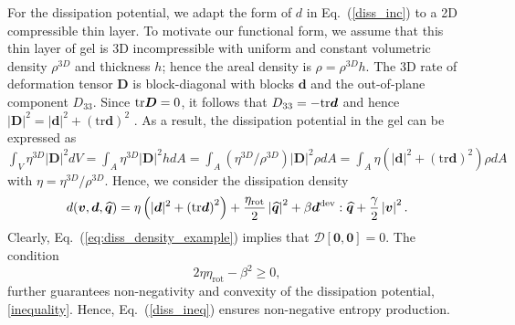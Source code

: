 \documentclass[12pt]{iopart}
\begin{document}
	For the dissipation potential, we adapt the form of $d$ in Eq.~(\ref{diss_inc}) to a 2D compressible thin layer. To motivate our functional form, we assume that this thin layer of gel is 3D incompressible with uniform and constant volumetric density $\rho^{3D}$ and thickness $h$; hence the areal density is $\rho = \rho^{3D} h$. The 3D rate of deformation tensor $\bm{D}$
	is block-diagonal with blocks $\bm{d}$ and the out-of-plane component $D_{33}$. Since ${\rm tr}\bm{D}=0$, it follows that $D_{33} = -{\rm tr}\bm{d}$ and hence $|\bm{D}|^2 = |\bm{d}|^2 + \left(\text{tr}\bm{d}\right)^2$  \cite{salbreux2009}. As a result, the dissipation potential in the gel can be expressed as $\int_V \eta^{3D} |\bm{D}|^2 dV = \int_A \eta^{3D} |\bm{D}|^2 h dA= \int_A (\eta^{3D}/\rho^{3D}) |\bm{D}|^2 \rho dA =  \int_A \eta(|\bm{d}|^2 + \left(\text{tr}\bm{d}\right)^2)\rho dA$ with $\eta =\eta^{3D}/\rho^{3D}$. Hence, we consider the dissipation density
	\begin{equation}
		\label{eq:diss_density_example}
		d(\bm{v},\bm{d},\widehat{\bm{q}}) =  \eta \left(|\bm{d}|^2 + \left(\text{tr}\bm{d}\right)^2\right) +\frac{\eta_{\text{rot}}}{2}  \left|\widehat{\bm{q}}\right|^2+ \beta  \bm{d}^{\rm dev}:\widehat{\bm{q}}  + \frac{\gamma}{2} \left|\bm{v}\right|^2.
	\end{equation}
	Clearly, Eq.~(\ref{eq:diss_density_example}) implies that $\mathcal{D}\left[\bm{0},\bm{0}\right]=0$. The condition
	\begin{equation}
		2\eta \eta_{\text{rot}} - \beta^2 \ge 0,
		\label{diss_ineq}
	\end{equation}
	further guarantees non-negativity and convexity of the dissipation potential, \ref{inequality}. Hence, Eq.~(\ref{diss_ineq}) ensures non-negative entropy production.
	
\end{document}
